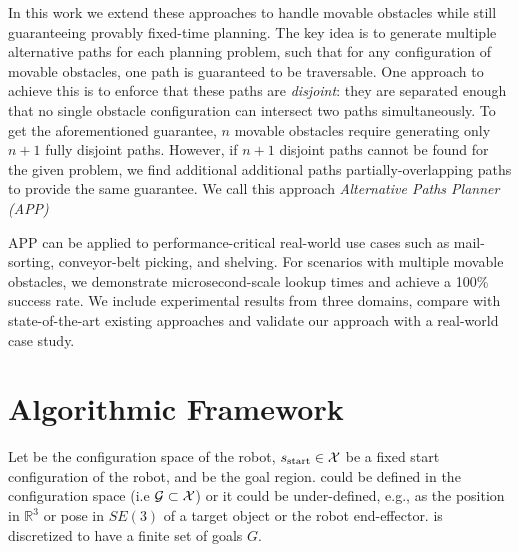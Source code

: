 \documentclass[a4paper]{report}
\begin{document}
In this work we extend these approaches to handle movable obstacles while still guaranteeing provably fixed-time planning.
The key idea is to generate multiple alternative paths for each planning problem, such that for any configuration of movable obstacles, one path is guaranteed to be traversable.
One approach to achieve this is to enforce %
that these paths are \emph{disjoint}: they are separated enough that no single obstacle configuration can intersect two paths simultaneously.
To get the aforementioned guarantee, $n$ movable obstacles require generating only $n+1$ fully disjoint paths.
However, if $n+1$ disjoint paths cannot be found for the given problem, we find additional additional paths partially-overlapping paths to provide the same guarantee.
We call this approach \emph{Alternative Paths Planner (APP)}

APP can be applied to performance-critical real-world use cases such as mail-sorting, conveyor-belt picking, and shelving. 
For scenarios with multiple movable obstacles, we demonstrate microsecond-scale lookup times and achieve a 100\% success rate. We include experimental results from three domains, compare with state-of-the-art existing approaches and validate our approach with a real-world case study. 

\section{Algorithmic Framework}
\label{subsec:setup}
Let \calX be the configuration space of the robot, $s_{\textrm{start}} \in \mathcal{X}$ be a fixed start configuration of the robot, and \calG be the goal region. 
\calG could be defined in the configuration space \calX (i.e $\mathcal{G} \subset \mathcal{X}$) or it could be under-defined, e.g., as the position in $\mathbb{R}^3$ or pose in $SE(3)$ of a target object or the robot end-effector. \calG is discretized to have a finite set of goals $G$. 
\end{document}
